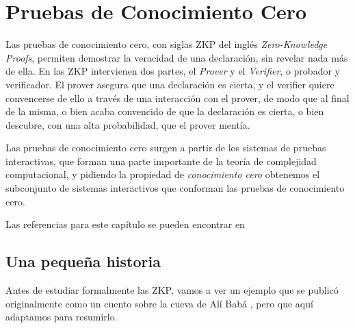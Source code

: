 \chapter{Pruebas de Conocimiento Cero}\label{ch:zkp} 

% 


%	




Las pruebas de conocimiento cero, con siglas ZKP del inglés \textit{Zero-Knowledge Proofs}, permiten demostrar la veracidad de una declaración, sin revelar nada más de ella. En las ZKP intervienen dos partes, el \textit{Prover} y el \textit{Verifier}, o probador y verificador. El prover asegura que una declaración es cierta, y el verifier quiere convencerse de ello a través de una interacción con el prover, de modo que al final de la misma, o bien acaba convencido de que la declaración es cierta, o bien descubre, con una alta probabilidad, que el prover mentía.

Las pruebas de conocimiento cero surgen a partir de los sistemas de pruebas interactivas, que forman una parte importante de la teoría de complejidad computacional, y pidiendo la propiedad de \textit{conocimiento cero} obtenemos el subconjunto de sistemas interactivos que conforman las pruebas de conocimiento cero.

Las referencias para este capítulo se pueden encontrar en %


\section{Una pequeña historia}

Antes de estudiar formalmente las ZKP, vamos a ver un ejemplo que se publicó originalmente como un cuento sobre la cueva de Alí Babá \citep{ZKPcave:story}, pero que aquí adaptamos para resumirlo.

